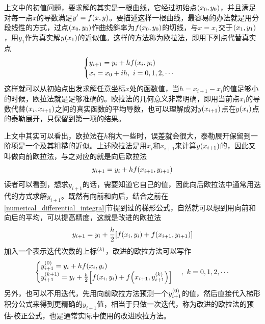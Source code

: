 \documentclass[12pt,a4paper,openany,twoside]{book}
\numberwithin{equation}{section}
\begin{document}
      上文中的初值问题，要求解的其实是一根曲线，它经过初始点$\qty(x_0,y_0)$，并且满足对每一点$x$的导数满足$y'=f\qty(x,y)$。要描述这样一根曲线，最容易的办法就是用分段线性的方式，过点$\qty(x_0,y_0)$作曲线斜率为$f\qty(x_0,y_0)$的切线，与$x=x_1$交于$\qty(x_1,y_1)$，用$y_1$作为真实解$y\qty(x_1)$的近似值。这样的方法称为欧拉法，即用下列点代替真实点
      \begin{equation}
        \begin{cases}
          y_{i+1}=y_i+hf\qty(x_i, y_i)\\
          x_i=x_0+ih,\ i=0,1,2,\cdots
        \end{cases}
      \end{equation}
      这样就可以从初始点出发求解任意坐标$x$处的函数值，当$h=x_{i+1}-x_i$的值足够小的时候，欧拉法就是足够准确的。欧拉法的几何意义非常明确，即用当前点$x_i$的导数代替$\qty(x_i,x_{i+1})$之间的真实函数的平均导数，也可以理解成对$y\qty(x_{i+1})$点在$y\qty(x_i)$点的泰勒展开，只保留到第一项的结果。

      上文中其实可以看出，欧拉法在$h$稍大一些时，误差就会很大，泰勒展开保留到一阶项是一个及其粗糙的近似。上述欧拉法是用$x_i$和$x_{i+1}$来计算$y\qty(x_{i+1})$的，因此又叫做向前欧拉法，与之对应的就是向后欧拉法
      \begin{equation}
        y_{i+1}=y_i+hf\qty(x_{i+1}, y_{i+1})
      \end{equation}
      读者可以看到，想求$y_{i+1}$的话，需要知道它自己的值，因此向后欧拉法中通常用迭代的方式求解$y_{i+1}$。既然有向前和向后，结合之前在\ref{numerical_differential_integral}节提到过的梯形公式，自然就可以想到用向前和向后的平均，可以提高精度，这就是改进的欧拉法
      \begin{equation*}
        y_{i+1}=y_i+\frac{h}{2}\qty[f\qty(x_i,y_i)+f\qty(x_{i+1},y_{i+1})]
      \end{equation*}
      加入一个表示迭代次数的上标$^\qty(k)$，改进的欧拉方法可以写作
      \begin{equation}
        \begin{cases}
          y_{i+1}^\qty(0)=y_i+hf\qty(x_i,y_i)\\
          y_{i+1}^\qty(k+1)=y_i+\frac{h}{2}\qty[f\qty(x_i,y_i)+f\qty(x_{i+1},y_{i+1}^\qty(k))]
        \end{cases},\ k=0,1,2,\cdots
      \end{equation}
      另外，也可以不用迭代，先用向前欧拉方法预测一个$y_{i+1}^\qty(0)$的值，然后直接代入梯形积分公式来得到更精确的$y_{i+1}$值，相当于只做一次迭代，称为改进的欧拉法的预估-校正公式，也是通常实际中使用的改进欧拉方法。
\end{document}
